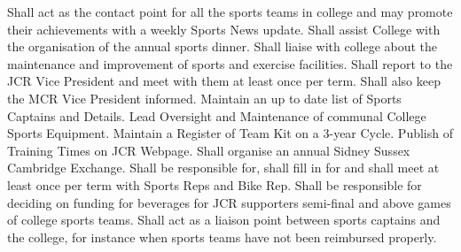 Shall act as the contact point for all the sports teams in college and may promote their achievements with a weekly Sports News update. 
Shall assist College with the organisation of the annual sports dinner.
Shall liaise with college about the maintenance and improvement of sports and exercise facilities.
Shall report to the JCR Vice President and meet with them at least once per term. Shall also keep the MCR Vice President informed.
Maintain an up to date list of Sports Captains and Details.
Lead Oversight and Maintenance of communal College Sports Equipment.
Maintain a Register of Team Kit on a 3-year Cycle.
Publish of Training Times on JCR Webpage.
Shall organise an annual Sidney Sussex Cambridge Exchange.
Shall be responsible for, shall fill in for and shall meet at least once per term with Sports Reps and Bike Rep.
Shall be responsible for deciding on funding for beverages for JCR supporters semi-final and above games of college sports teams.
Shall act as a liaison point between sports captains and the college, for instance when sports teams have not been reimbursed properly.
